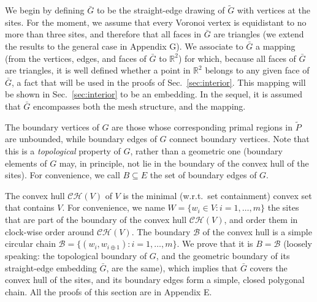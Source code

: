 \documentclass[11pt]{article}
\begin{document}
We begin by defining $\bar{G}$ to be the straight-edge drawing of $\tilde{G}$ with vertices at the sites. For the moment, we assume that every Voronoi vertex is equidistant to no more than three sites, and therefore that all faces in $\bar{G}$ are triangles 
(we extend the results to the general case in Appendix G). We associate to $\bar{G}$ a mapping (from the vertices, edges, and faces
of $\bar{G}$ to $\mathbb{R}^2$) for which, because all faces of $\bar{G}$ are triangles, it is well defined whether a point in
$\mathbb{R}^2$ belongs to any given face of $\bar{G}$, a fact that will be
used in the proofs of Sec.~\ref{sec:interior}. 
This mapping will be shown in Sec.~\ref{sec:interior} to be an embedding. 
In the sequel, it is assumed that $\bar{G}$ encompasses both the mesh
structure, and the mapping. 










The boundary vertices of $G$ are those whose corresponding primal regions in $\tilde{P}$ are unbounded, 
while boundary edges of $G$ connect boundary vertices. 
Note that this is a \emph{topological} property of $G$, rather than a geometric one (boundary elements of $G$ may, in principle, not lie in the boundary of the convex hull of the sites). 
For convenience, we call $B\subseteq E$ the set of boundary edges of $G$. 




The convex hull $\mathcal{CH}(V)$ of $V$ is the minimal (w.r.t.\ set
containment) convex set that contains $V$. 
For convenience, we name $W=\{w_i\in V : i=1,\dots,m\}$ the sites that are part of the boundary of
the convex hull $\mathcal{CH}(V)$, and order them in clock-wise order around $\mathcal{CH}(V)$. 
The boundary $\mathcal{B}$ of the convex hull is a simple circular chain 
$\mathcal{B} = \{(w_i, w_{i\oplus 1}) : i=1,\dots,m\}$. We prove that it is $B=\mathcal{B}$ 
(loosely speaking: the topological boundary of $G$, and the geometric boundary of its straight-edge embedding $\bar{G}$, are the same), 
which implies that $\bar{G}$ covers
the convex hull of the sites, and its boundary edges form 
a simple, closed polygonal chain. All the proofs of this section are in Appendix E. 
\end{document}
